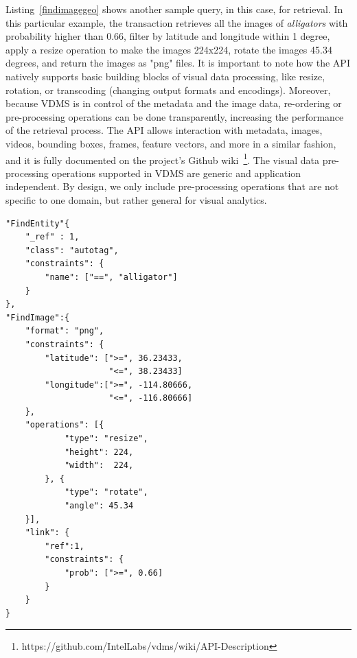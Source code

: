 Listing~\ref{findimagegeo} shows another sample query, in this case, for retrieval.
In this particular example, the transaction retrieves all the images
of \textit{alligators} with probability higher than 0.66,
filter by latitude and longitude within 1 degree,
apply a resize operation to make the images 224x224,
rotate the images 45.34 degrees, and return the images as "png" files.
It is important to note how the API natively supports basic building
blocks of visual data processing, like resize, rotation, or transcoding
(changing output formats and encodings).
Moreover, because VDMS is in control of the metadata and the image data,
re-ordering or pre-processing operations can be done transparently,
increasing the performance of the retrieval process.
The API allows interaction with metadata, images, videos, bounding boxes,
frames, feature vectors, and more in a similar fashion,
and it is fully documented on the project's Github
wiki~\footnote{https://github.com/IntelLabs/vdms/wiki/API-Description}.
The visual data pre-processing operations supported in VDMS are generic and
application independent.
By design, we only include pre-processing operations that are not specific
to one domain, but rather general for visual analytics.



\begin{listing}[ht!]
\begin{verbatim}
"FindEntity"{
    "_ref" : 1,
    "class": "autotag",
    "constraints": {
        "name": ["==", "alligator"]
    }
},
"FindImage":{
    "format": "png",
    "constraints": {
        "latitude": [">=", 36.23433,
                     "<=", 38.23433]
        "longitude":[">=", -114.80666,
                     "<=", -116.80666]
    },
    "operations": [{
            "type": "resize",
            "height": 224,
            "width":  224,
        }, {
            "type": "rotate",
            "angle": 45.34
    }],
    "link": {
        "ref":1,
        "constraints": {
            "prob": [">=", 0.66]
        }
    }
}

\end{verbatim}
\caption{Sample Query for Image Retrieval -
The query expresses the following:
Find all the images connected to the autotag \textit{alligator}
with probability higher than 0.66,
filter the images by latitude and longitude within 1 degree,
apply a resize operation to make the images 224x224,
rotate the image 45.34 degrees,
and return the images as "png" files.}
\label{findimagegeo}
\end{listing}

